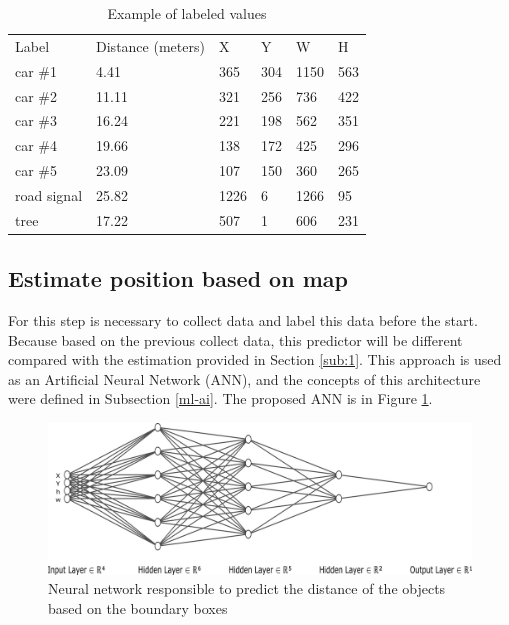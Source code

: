 \begin{table}[H]
\centering
\caption{Example of labeled values}
\begin{tabular}{llllll} 
\hline
Label        & Distance (meters) & X    & Y   & W    & H   \\
car \#1         & 4.41     & 365  & 304 & 1150 & 563  \\
car \#2        & 11.11    & 321  & 256 & 736  & 422  \\
car \#3        & 16.24    & 221  & 198 & 562  & 351  \\
car \#4        & 19.66    & 138  & 172 & 425  & 296  \\
car \#5        & 23.09    & 107  & 150 & 360  & 265  \\
road signal & 25.82    & 1226 & 6   & 1266 & 95   \\
tree        & 17.22    & 507  & 1   & 606  & 231  \\
\hline
\end{tabular}
 \label{tab:output_table}
\end{table}

\subsection{Estimate position based on map}

For this step is necessary to collect data and label this data before the start. Because based on the previous collect data, this predictor will be different compared with the estimation provided in Section \ref{sub:1}. This approach is used as an Artificial Neural Network (ANN), and the concepts of this architecture were defined in 
Subsection \ref{ml-ai}. The proposed ANN is in Figure \ref{fig:rede_neural}.


\begin{figure}[H]
\centering
\includegraphics[width=\textwidth]{imagens/nn.png}
\caption{Neural network responsible to predict the distance of the objects based on the boundary boxes}
\label{fig:rede_neural}
\end{figure}

